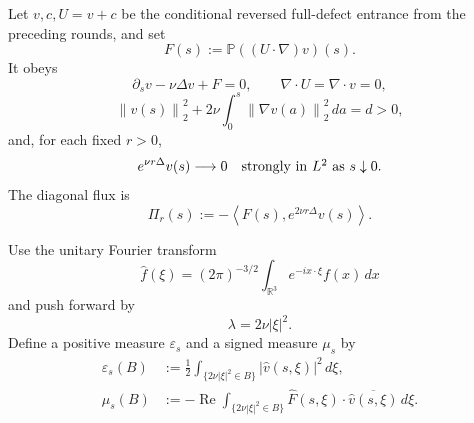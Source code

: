 \documentclass[11pt]{article}
\theoremstyle{remark}
\newcommand{\R}{\mathbb R}
\newcommand{\Pp}{\mathbb P}
\newcommand{\norm}[1]{\left\|#1\right\|}
\newcommand{\ip}[2]{\left\langle #1,#2\right\rangle}
\begin{document}
Let \(v,c,U=v+c\) be the conditional reversed full-defect entrance from
the preceding rounds, and set
\begin{equation}
\label{eq:F}
 F(s):=\Pp((U\cdot\nabla)v)(s).
\end{equation}
It obeys
\begin{equation}
\label{eq:evolution}
 \partial_s v-\nu\Delta v+F=0,
 \qquad \nabla\cdot U=\nabla\cdot v=0,
\end{equation}
\begin{equation}
\label{eq:energy}
 \norm{v(s)}_2^2+
 2\nu\int_0^s\norm{\nabla v(a)}_2^2\,da=d>0,
\end{equation}
and, for each fixed \(r>0\),
\begin{equation}
\label{eq:heat-boundary}
 e^{\nu r\Delta}v(s)\longrightarrow0
 \quad\hbox{strongly in \(L^2\) as \(s\downarrow0\)}.
\end{equation}
The diagonal flux is
\begin{equation}
\label{eq:Pi}
 \Pi_r(s):=-\ip{F(s)}{e^{2\nu r\Delta}v(s)}.
\end{equation}

Use the unitary Fourier transform
\[
 \widehat f(\xi)
 =(2\pi)^{-3/2}\int_{\R^3}e^{-ix\cdot\xi}f(x)\,dx
\]
and push forward by
\begin{equation}
\label{eq:lambda}
 \lambda=2\nu|\xi|^2.
\end{equation}
Define a positive measure \(\varepsilon_s\) and a signed measure
\(\mu_s\) by
\begin{align}
\label{eq:epsilon}
 \varepsilon_s(B)
 &:=
 \frac12\int_{\{2\nu|\xi|^2\in B\}}
 |\widehat v(s,\xi)|^2\,d\xi,\\
\label{eq:mu}
 \mu_s(B)
 &:=
 -\operatorname{Re}
 \int_{\{2\nu|\xi|^2\in B\}}
 \widehat F(s,\xi)\cdot
 \overline{\widehat v(s,\xi)}\,d\xi.
\end{align}
\end{document}
